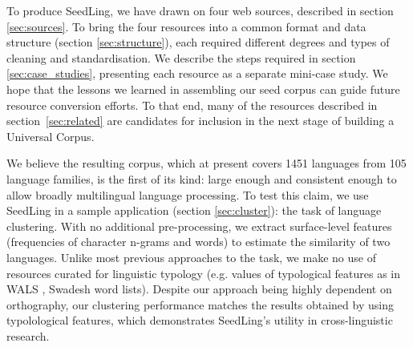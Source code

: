 To produce SeedLing, we have drawn on four web sources, described in section \ref{sec:sources}. To bring the four resources into a common format and data structure (section \ref{sec:structure}), each required different degrees and types of cleaning and standardisation. We describe the steps required in section \ref{sec:case_studies}, presenting each resource as a separate mini-case study. We hope that the lessons we learned in assembling our seed corpus can guide future resource conversion efforts. To that end, many of the resources described in section~\ref{sec:related} are candidates for inclusion in the next stage of building a Universal Corpus.

We believe the resulting corpus, which at present covers 1451 languages from 105 language families, is the first of its kind: large enough and consistent enough to allow broadly multilingual language processing. To test this claim, we use SeedLing in a sample application (section \ref{sec:cluster}): the task of language clustering. With no additional pre-processing, we extract surface-level features (frequencies of character n-grams and words) to estimate the similarity of two languages. Unlike most previous approaches to the task, we make no use of resources curated for linguistic typology (e.g. values of typological features as in WALS \cite{wals}, Swadesh word lists). Despite our approach being highly dependent on orthography, our clustering performance matches the results obtained by  using typolological features, which demonstrates SeedLing's utility in cross-linguistic research.
